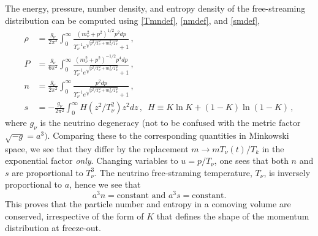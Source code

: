 The energy, pressure, number density, and entropy density of the free-streaming distribution can be computed using \eqref{Tmndef}, \eqref{nmdef}, and \eqref{smdef},
\begin{align}
\rho&=\frac{g_\nu}{2\pi^2}\!\int_0^\infty\!\!\!\frac{\left(m_\nu^2+p^2\right)^{1/2}p^2dp }{\Upsilon_\nu^{-1}e^{\sqrt{p^2/T_\nu^2+m_\nu^2/T_k^2}}+ 1}\,,\label{neutrino_rho}\\[0.2cm]
P&=\frac{g_\nu}{6\pi^2}\!\int_0^\infty\!\!\!\frac{\left(m_\nu^2+p^2\right)^{-1/2}p^4dp }{\Upsilon_\nu^{-1} e^{\sqrt{p^2/T_\nu^2+m_\nu^2/T_k^2}}+ 1}\,,\label{neutrino_P}\\[0.2cm]
n&=\frac{g_\nu}{2\pi^2}\!\int_0^\infty\!\!\!\frac{p^2dp }{\Upsilon_\nu^{-1}e^{\sqrt{p^2/T_\nu^2+m_\nu^2/T_k^2}}+ 1}\,,\label{num_density}\\
s&=-\frac{g_\nu}{2\pi^2}\!\int_0^\infty\!\!\!H(z^2/T_\nu^2)z^2dz\,,\,\,\,H\equiv K\ln K +(1-K)\ln(1-K)\,,\label{entropy_integrand}
\end{align}
where $g_\nu$ is the neutrino degeneracy (not to be confused with the metric factor $\sqrt{-g}=a^3)$.
Comparing these to the corresponding quantities in Minkowski space, we see that they differ by the replacement $m\rightarrow m T_\nu(t)/T_k$ in the exponential factor  {\em only}.  Changing variables to $u=p/T_\nu$, one sees that both $n$ and $s$ are proportional to $T_\nu^3$.  The neutrino free-straming temperature, $T_\nu$, is inversely proportional to $a$, hence we see that
\begin{equation}\label{const_entropy}
a^3n=\text{constant}\text{ and } a^3s=\text{constant}.
\end{equation}
This proves that the particle number and entropy in a comoving volume are conserved, irrespective of the  form of $K$ that defines the shape of the momentum distribution at freeze-out. 


